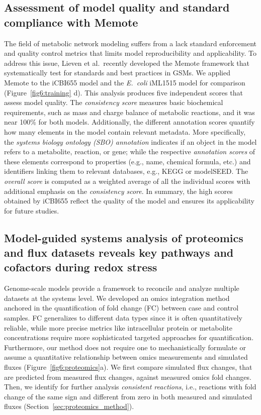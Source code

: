 \subsection{Assessment of model quality and standard compliance with Memote}
The field of metabolic network modeling suffers from a lack standard enforcement and quality control metrics that limits model reproducibility and applicability.
To address this issue, Lieven et al.\ recently developed the Memote framework that systematically test for standards and best practices in GSMs. \citep{lieven2018}
We applied Memote to the iCBI655 model and the \textit{E.~coli} iML1515 model for comparison (Figure~\ref{fig6:training} d). This analysis produces five independent scores that assess model quality.
The \emph{consistency score}  measures basic biochemical requirements, such as mass and charge balance of metabolic reactions, and it was near 100\% for both models.
Additionally, the different annotation scores quantify how many elements in the model contain relevant metadata. More specifically, the \emph{systems biology ontology (SBO) annotation} indicates if an object in the model refers to a metabolite, reaction, or gene; while the respective \emph{annotation scores} of these elements correspond to properties (e.g., name, chemical formula, etc.) and identifiers linking them to relevant databases, e.g., KEGG\citep{kanehisa2000} or modelSEED.\citep{henry2010} The \emph{overall score} is computed as a weighted average of all the individual scores with additional emphasis on the \emph{consistency score}.
In summary, the high scores obtained by iCBI655 reflect the quality of the model and ensures its applicability for future studies.


\subsection{Model-guided systems analysis of proteomics and flux datasets reveals key pathways and cofactors during redox stress} \label{sec:omics_analysis}

Genome-scale models provide a framework to reconcile and analyze multiple datasets at the systems level.
We developed an omics integration method anchored in the quantification of fold change (FC) between case and control samples. FC generalizes to different data types since it is often quantitatively reliable, while more precise metrics like intracellular protein or metabolite concentrations require more sophisticated targeted approaches for quantification. Furthermore, our method does not require one to mechanistically formulate or assume a quantitative relationship between omics measurements and simulated fluxes (Figure~\ref{fig6:proteomics}a).
We first compare simulated flux changes, that are predicted from measured flux changes, against measured omics fold changes.
Then, we identify for further analysis \emph{consistent reactions}, i.e., reactions with fold change of the same sign and different from zero in both measured and simulated fluxes (Section~\ref{sec:proteomics_method}).

